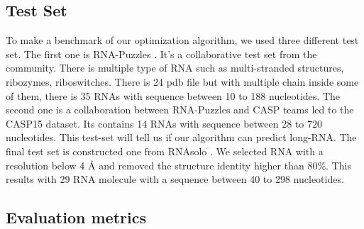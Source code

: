 \documentclass[11pt,a4paper]{article}
\begin{document}
\subsection{Test Set}

To make a benchmark of our optimization algorithm, we used three different test set. The first one is RNA-Puzzles \cite{b56a52a4a212429e973b1fcd72be4f04}. It's a collaborative test set from the community. There is multiple type of RNA such as multi-stranded structures, ribozymes, riboswitches. There is 24 pdb file but with multiple chain inside some of them, there is 35 RNAs with sequence between 10 to 188 nucleotides. The second one is a collaboration between RNA-Puzzles and CASP teams led to the CASP15 \cite{https://doi.org/10.1002/prot.26602} dataset. Its contains 14 RNAs with sequence between 28 to 720 nucleotides. This test-set will tell us if our algorithm can predict long-RNA. The final test set is constructed one from RNAsolo \cite{10.1093/bioinformatics/btac386}. We selected RNA with a resolution below 4 \r{A} and removed the structure identity higher than 80\%. This results with 29 RNA molecule with a sequence between 40 to 298 nucleotides. 

\subsection{Evaluation metrics}
\end{document}
